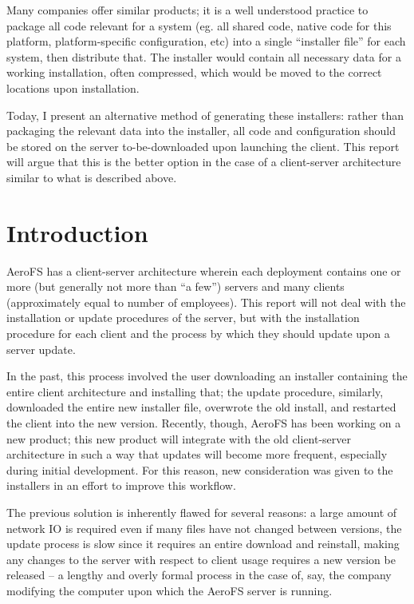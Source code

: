 \documentclass[12pt]{article}
\begin{document}
Many companies offer similar products; it is a well understood practice to package all code relevant for a system (eg. all shared code, native code for this platform, platform-specific configuration, etc) into a single ``installer file'' for each system, then distribute that. The installer would contain all necessary data for a working installation, often compressed, which would be moved to the correct locations upon installation.

Today, I present an alternative method of generating these installers: rather than packaging the relevant data into the installer, all code and configuration should be stored on the server to-be-downloaded upon launching the client. This report will argue that this is the better option in the case of a client-server architecture similar to what is described above.
\newpage


\toc
\lot


\section{Introduction}
AeroFS has a client-server architecture wherein each deployment contains one or more (but generally not more than ``a few'') servers and many clients (approximately equal to number of employees). This report will not deal with the installation or update procedures of the server, but with the installation procedure for each client and the process by which they should update upon a server update.

In the past, this process involved the user downloading an installer containing the entire client architecture and installing that; the update procedure, similarly, downloaded the entire new installer file, overwrote the old install, and restarted the client into the new version. Recently, though, AeroFS has been working on a new product; this new product will integrate with the old client-server architecture in such a way that updates will become more frequent, especially during initial development. For this reason, new consideration was given to the installers in an effort to improve this workflow.

The previous solution is inherently flawed for several reasons: a large amount of network IO is required even if many files have not changed between versions, the update process is slow since it requires an entire download and reinstall, making any changes to the server with respect to client usage requires a new version be released -- a lengthy and overly formal process in the case of, say, the company modifying the computer upon which the AeroFS server is running.
\end{document}
